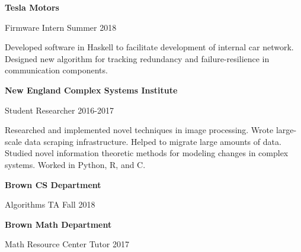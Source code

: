 \documentclass{article}
\renewcommand{\section}[1]{\vspace{1.5em}{\huge \textsc{#1}}\vspace{1em}}
\renewcommand{\subsection}[1]{{\large \textbf{#1}}\vspace{0.5em}}
\newcommand{\descdate}[2]{#1 \hfill #2\vspace{0.5em}}
\newenvironment{row}{\vspace{0.5em}\begin{minipage}[t]{\textwidth}}{\end{minipage}\vspace{0.5em}}
\newenvironment{column2}{%
  \begin{minipage}[t]{0.5\textwidth}%
    \begin{minipage}[t]{0.9\textwidth}}{%
    \end{minipage}%
  \end{minipage}}
\begin{document}
\begin{row}
  \begin{column2}
    \subsection{Tesla Motors}

    \descdate{Firmware Intern}{Summer 2018}

    Developed software in Haskell to facilitate development of internal car network. Designed new algorithm for tracking redundancy and failure-resilience in communication components.
  \end{column2}
  \begin{column2}
    \subsection{New England Complex Systems Institute}

    \descdate{Student Researcher}{2016-2017}

    Researched and implemented novel techniques in image processing. Wrote large-scale data scraping infrastructure. Helped to migrate large amounts of data. Studied novel information theoretic methods for modeling changes in complex systems. Worked in Python, R, and C.%
  \end{column2}
\end{row}

\begin{row}
  \begin{column2}
    \subsection{Brown CS Department}

    \descdate{Algorithms TA}{Fall 2018}
  \end{column2}
  \begin{column2}
    \subsection{Brown Math Department}

    \descdate{Math Resource Center Tutor}{2017}
  \end{column2}
\end{row}

\end{document}
